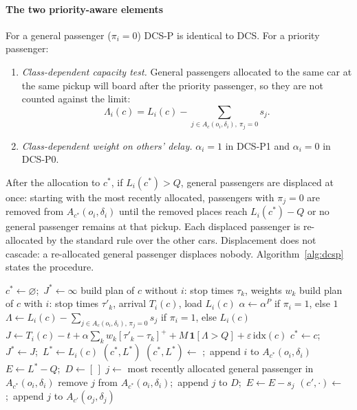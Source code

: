 \documentclass[12pt,a4paper]{article}
\newcommand{\pos}[1]{[#1]^{+}}
\begin{document}
\paragraph{The two priority-aware elements} For a general passenger ($\pi_i=0$) DCS-P is identical to DCS. For a priority passenger:
\begin{enumerate}[itemsep=1pt]
\item \emph{Class-dependent capacity test.} General passengers allocated to the same car at the same pickup will board after the priority passenger, so they are not counted against the limit:
\begin{equation}
\Lambda_i(c)=L_i(c)-\sum_{j\in A_c(o_i,\delta_i),\ \pi_j=0}s_j .
\label{eq:lambda}
\end{equation}
\item \emph{Class-dependent weight on others' delay.} $\alpha_i=1$ in DCS-P1 and $\alpha_i=0$ in DCS-P0.
\end{enumerate}
After the allocation to $c^\ast$, if $L_i(c^\ast)>Q$, general passengers are displaced at once: starting with the most recently allocated, passengers with $\pi_j=0$ are removed from $A_{c^\ast}(o_i,\delta_i)$ until the removed places reach $L_i(c^\ast)-Q$ or no general passenger remains at that pickup. Each displaced passenger is re-allocated by the standard rule over the other cars. Displacement does not cascade: a re-allocated general passenger displaces nobody. Algorithm~\ref{alg:dcsp} states the procedure.

\begin{algorithm}[htbp]
\caption{DCS-P allocation of an arriving passenger $i$ at time $t$ (DCS-P1: $\alpha^{P}=1$; DCS-P0: $\alpha^{P}=0$)}\label{alg:dcsp}
\small
\begin{algorithmic}[1]
\State $c^\ast\gets\varnothing$;\ $J^\ast\gets\infty$
  \State build plan of $c$ without $i$: stop times $\tau_k$, weights $w_k$
  \State build plan of $c$ with $i$: stop times $\tau'_k$, arrival $T_i(c)$, load $L_i(c)$
  \State $\alpha\gets\alpha^{P}$ if $\pi_i=1$, else $1$
  \State $\Lambda\gets L_i(c)-\sum_{j\in A_c(o_i,\delta_i),\,\pi_j=0}s_j$ if $\pi_i=1$, else $L_i(c)$
  \State $J\gets T_i(c)-t+\alpha\sum_k w_k\pos{\tau'_k-\tau_k}+M\,\mathbf{1}[\Lambda>Q]+\varepsilon\,\mathrm{idx}(c)$
   $c^\ast\gets c$;\ $J^\ast\gets J$;\ $L^\ast\gets L_i(c)$ \EndIf
\EndFor
\State \Return $(c^\ast,L^\ast)$
\EndFunction
\Statex
{}
\State $(c^\ast,L^\ast)\gets$ ;\ append $i$ to $A_{c^\ast}(o_i,\delta_i)$
  \State $E\gets L^\ast-Q$;\ $D\gets[\,]$
     \State $j\gets$ most recently allocated general passenger in $A_{c^\ast}(o_i,\delta_i)$
     \State remove $j$ from $A_{c^\ast}(o_i,\delta_i)$;\ append $j$ to $D$;\ $E\gets E-s_j$
  \EndWhile
     \State $(c',\cdot)\gets$ ;\ append $j$ to $A_{c'}(o_j,\delta_j)$
  \EndFor
\EndIf
\EndProcedure
\end{algorithmic}
\end{algorithm}
\end{document}
